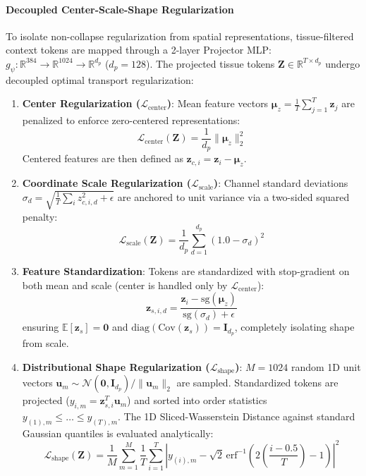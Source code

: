 \documentclass{article}
\begin{document}
\paragraph{Decoupled Center-Scale-Shape Regularization}
To isolate non-collapse regularization from spatial representations, tissue-filtered context tokens are mapped through a 2-layer Projector MLP: $g_\psi: \mathbb{R}^{384} \to \mathbb{R}^{1024} \to \mathbb{R}^{d_p}$ ($d_p = 128$). The projected tissue tokens $\mathbf{Z} \in \mathbb{R}^{T \times d_p}$ undergo decoupled optimal transport regularization:
\begin{enumerate}
    \item \textbf{Center Regularization ($\mathcal{L}_{\text{center}}$)}: Mean feature vectors $\boldsymbol{\mu}_z = \frac{1}{T}\sum_{j=1}^T \mathbf{z}_j$ are penalized to enforce zero-centered representations:
    \begin{equation}
        \mathcal{L}_{\text{center}}(\mathbf{Z}) = \frac{1}{d_p} \|\boldsymbol{\mu}_z\|_2^2
    \end{equation}
    Centered features are then defined as $\mathbf{z}_{c, i} = \mathbf{z}_i - \boldsymbol{\mu}_z$.
    \item \textbf{Coordinate Scale Regularization ($\mathcal{L}_{\text{scale}}$)}: Channel standard deviations $\sigma_d = \sqrt{\frac{1}{T}\sum_i z_{c, i, d}^2 + \epsilon}$ are anchored to unit variance via a two-sided squared penalty:
    \begin{equation}
        \mathcal{L}_{\text{scale}}(\mathbf{Z}) = \frac{1}{d_p} \sum_{d=1}^{d_p} (1.0 - \sigma_d)^2
    \end{equation}
    \item \textbf{Feature Standardization}: Tokens are standardized with stop-gradient on both mean and scale (center is handled only by $\mathcal{L}_{\text{center}}$):
    \begin{equation}
        \mathbf{z}_{s, i, d} = \frac{\mathbf{z}_i - \text{sg}(\boldsymbol{\mu}_z)}{\text{sg}(\sigma_d) + \epsilon}
    \end{equation}
    ensuring $\mathbb{E}[\mathbf{z}_s] = \mathbf{0}$ and $\text{diag}(\text{Cov}(\mathbf{z}_s)) = \mathbf{I}_{d_p}$, completely isolating shape from scale.
    \item \textbf{Distributional Shape Regularization ($\mathcal{L}_{\text{shape}}$)}: $M = 1024$ random 1D unit vectors $\mathbf{u}_m \sim \mathcal{N}(\mathbf{0}, \mathbf{I}_{d_p}) / \|\mathbf{u}_m\|_2$ are sampled. Standardized tokens are projected ($y_{i, m} = \mathbf{z}_{s, i}^T \mathbf{u}_m$) and sorted into order statistics $y_{(1), m} \le \dots \le y_{(T), m}$. The 1D Sliced-Wasserstein Distance against standard Gaussian quantiles is evaluated analytically:
    \begin{equation}
        \mathcal{L}_{\text{shape}}(\mathbf{Z}) = \frac{1}{M} \sum_{m=1}^M \frac{1}{T} \sum_{i=1}^T \left| y_{(i), m} - \sqrt{2}\,\text{erf}^{-1}\left(2\left(\frac{i - 0.5}{T}\right) - 1\right) \right|^2
    \end{equation}
\end{enumerate}
\end{document}
